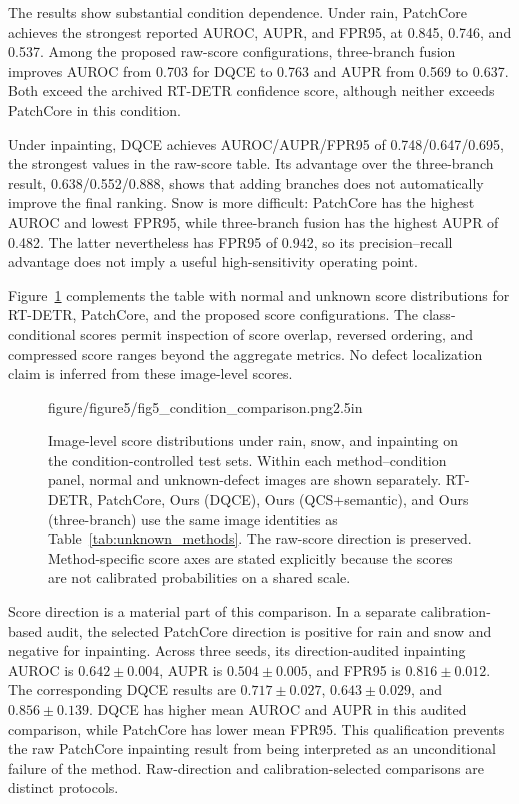 The results show substantial condition dependence. Under rain, PatchCore
achieves the strongest reported AUROC, AUPR, and FPR95, at
0.845, 0.746, and 0.537. Among the proposed raw-score configurations,
three-branch fusion improves AUROC from 0.703 for DQCE to 0.763 and AUPR
from 0.569 to 0.637. Both exceed the archived RT-DETR confidence score,
although neither exceeds PatchCore in this condition.

Under inpainting, DQCE achieves AUROC/AUPR/FPR95 of 0.748/0.647/0.695,
the strongest values in the raw-score table. Its advantage over the
three-branch result, 0.638/0.552/0.888, shows that adding branches does not
automatically improve the final ranking. Snow is more difficult: PatchCore
has the highest AUROC and lowest FPR95, while three-branch fusion has the
highest AUPR of 0.482. The latter nevertheless has FPR95 of 0.942, so its
precision--recall advantage does not imply a useful high-sensitivity
operating point.

Figure~\ref{fig:condition_scores} complements the table with normal and
unknown score distributions for RT-DETR, PatchCore, and the proposed score
configurations. The class-conditional scores permit inspection of score
overlap, reversed ordering, and compressed score ranges beyond the aggregate
metrics. No defect localization
claim is inferred from these image-level scores.

\begin{figure}[!t]
  \centering
    {figure/figure5/fig5_condition_comparison.png}{2.5in}
  \caption{Image-level score distributions under rain, snow, and inpainting
  on the condition-controlled test sets. Within each method--condition panel,
  normal and unknown-defect images are shown separately. RT-DETR, PatchCore,
  Ours (DQCE), Ours (QCS+semantic), and Ours (three-branch) use the same
  image identities as Table~\ref{tab:unknown_methods}. The raw-score direction
  is preserved. Method-specific score axes are stated explicitly because
  the scores are not calibrated probabilities on a shared scale.}
  \label{fig:condition_scores}
\end{figure}

Score direction is a material part of this comparison. In a separate
calibration-based audit, the selected PatchCore direction is positive for
rain and snow and negative for inpainting. Across three seeds, its
direction-audited inpainting AUROC is $0.642\pm0.004$, AUPR is
$0.504\pm0.005$, and FPR95 is $0.816\pm0.012$. The corresponding DQCE
results are $0.717\pm0.027$, $0.643\pm0.029$, and $0.856\pm0.139$.
DQCE has higher mean AUROC and AUPR in this audited comparison, while
PatchCore has lower mean FPR95. This qualification prevents the raw
PatchCore inpainting result from being interpreted as an unconditional
failure of the method. Raw-direction and calibration-selected comparisons
are distinct protocols.

